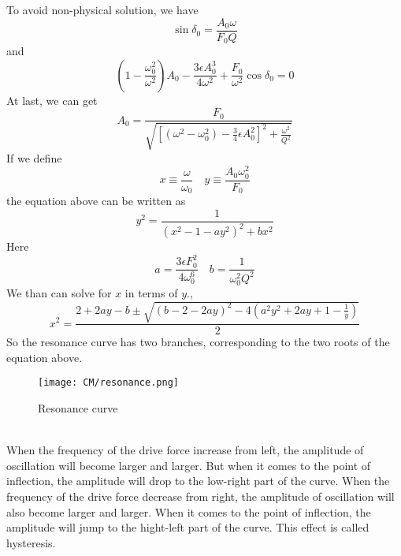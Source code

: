 To avoid non-physical solution, we have
\[\sin\delta_0 = \frac{A_0 \omega}{F_0 Q}\]
and
\[\left ( 1 - \frac{\omega_0^2}{\omega^2}\right ) A_0 - \frac{3\epsilon A_0^3}{4\omega^2} + \frac{F_0}{\omega^2}\cos\delta_0 = 0\]
At last, we can get
\[A_0 = \frac{F_0}{\sqrt{\left[ (\omega^2 -\omega_0^2) - \frac{3}{4}\epsilon A_0^2 \right ]^2 + \frac{\omega^2}{Q^2} }}\]
If we define
\[x \equiv \frac{\omega}{\omega_0} \quad y \equiv \frac{A_0 \omega_0^2}{F_0}\]
the equation above can be written as
\[y^2 = \frac{1}{(x^2-1-ay^2)^2 + bx^2}\]
Here
\[a = \frac{3\epsilon F_0^2}{4\omega_0^6} \quad b = \frac{1}{\omega_0^2 Q^2}\]
We than can solve for $x$ in terms of $y$.,
\[x^2 = \frac{2 + 2ay-b \pm \sqrt{(b-2-2ay)^2-4(a^2y^2+2ay+1-\frac{1}{y})}}{2}\]
So the resonance curve has two branches, corresponding to the two roots of the equation above.
\begin{figure}[!h]
	\centering
	\texttt{[image: CM/resonance.png]}
	\caption{Resonance curve}
\end{figure}\\ 
When the frequency of the drive force increase from left, the amplitude of oscillation will become larger and larger. But when it comes to the point of inflection, the amplitude will drop to the low-right part of the curve. 
When the frequency of the drive force decrease from right, the amplitude of oscillation will also become larger and larger. When it comes to the point of inflection, the amplitude will jump to the hight-left part of the curve. 
This effect is called hysteresis.

